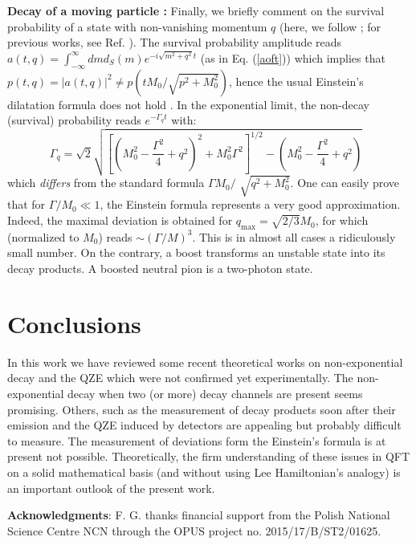 \documentclass[12pt]{article}%
\begin{document}
\textbf{Decay of a moving particle \cite{time}: }Finally, we briefly comment
on the survival probability of a state with non-vanishing momentum $q$ (here,
we follow \cite{time}; for previous works, see Ref.
\cite{khalfin2,shirokov,stefanovich,urbano}). The survival probability
amplitude reads $a(t,q)=\int_{-\infty}^{\infty}dmd_{S}(m)e^{-i\sqrt
{m^{2}+q^{2}}t}$ (as in Eq. (\ref{aoft})) which implies that
$p(t,q)=\left\vert a(t,q)\right\vert ^{2}\neq p\left(  tM_{0}/\sqrt
{p^{2}+M_{0}^{2}}\right)  $, hence the usual Einstein's dilatation formula
does not hold \cite{shirokov,stefanovich,urbano}. In the exponential limit,
the non-decay (survival) probability reads $e^{-\Gamma_{q}t}$ with:
\begin{equation}
\Gamma_{q}=\sqrt{2}\sqrt{\left[  \left(  M_{0}^{2}-\frac{\Gamma^{2}}{4}%
+q^{2}\right)  ^{2}+M_{0}^{2}\Gamma^{2}\right]  ^{1/2}-\left(  M_{0}^{2}%
-\frac{\Gamma^{2}}{4}+q^{2}\right)  }\text{ }\label{gammap}%
\end{equation}
which \textit{differs} from the standard formula $\Gamma M_{0}/$ $\sqrt
{q^{2}+M_{0}^{2}}$. One can easily prove that for $\Gamma/M_{0}\ll1$, the
Einstein formula represents a very good approximation. Indeed, the maximal
deviation is obtained for $q_{\max}=\sqrt{2/3}M_{0}$, for which (normalized to
$M_{0}$) reads $\sim\left(  \Gamma/M\right)  ^{3}$. This is in almost all
cases a ridiculously small number. On the contrary, a boost transforms an
unstable state into its decay products. A boosted neutral pion is a two-photon state.

\section{Conclusions}

In this work we have reviewed some recent theoretical works on non-exponential
decay and the QZE which were not confirmed yet experimentally. The
non-exponential decay when two (or more) decay channels are present seems
promising. Others, such as the measurement of decay products soon after their
emission and the QZE induced by detectors are appealing but probably difficult
to measure. The measurement of deviations form the Einstein's formula is at
present not possible. Theoretically, the firm understanding of these issues in
QFT on a solid mathematical basis (and without using Lee Hamiltonian's
analogy) is an important outlook of the present work.

\textbf{Acknowledgments}: F. G. thanks financial support from the Polish
National Science Centre NCN through the OPUS project no. 2015/17/B/ST2/01625.
\end{document}
